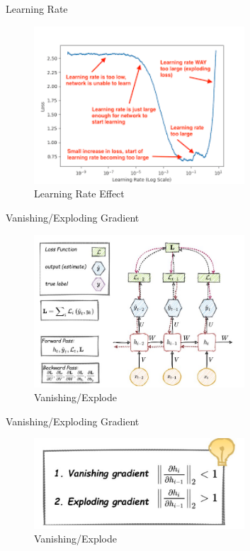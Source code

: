 \begin{frame}{Learning Rate}
	    \begin{figure}[H]
    		\centering
    		\includegraphics[width=0.7\textwidth]{Figs/lr_5.png}
    		\caption{Learning Rate Effect}
	    \end{figure}
\end{frame}

\begin{frame}{Vanishing/Exploding Gradient}
    \begin{figure}[H]
    		\centering
    		\includegraphics[width=0.7\textwidth]{Figs/van3.png}
    		\caption{Vanishing/Explode}
	    \end{figure}
\end{frame}

\begin{frame}{Vanishing/Exploding Gradient}
    \begin{figure}[H]
    		\centering
    		\includegraphics[width=0.7\textwidth]{Figs/van4.png}
    		\caption{Vanishing/Explode}
	    \end{figure}
\end{frame}

